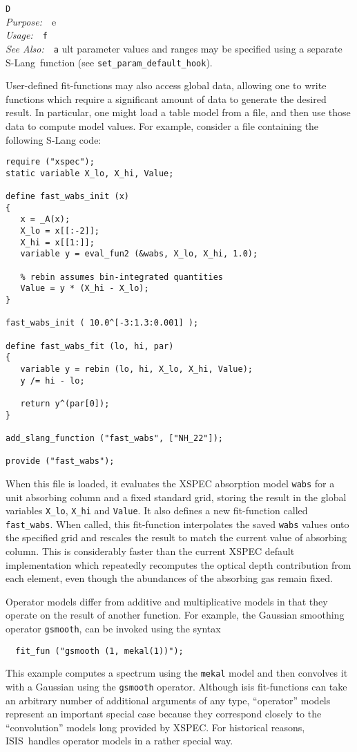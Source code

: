 \documentclass{book}
\makeatletter
\newif\ifpdf
\newcommand{\isis}{{\sc ISIS}}
\newcommand{\slang}{{\sc S-Lang}}
\newenvironment{isisfunction}[4]%
{\index{{#1}@{\tt #1}}%
  \ifpdf
  \else
     \addcontentsline{toc}{subsection}{{#1} -- {#2}}
  \fi
  \vbox{
          \vspace*{\baselineskip}
          {\LARGE\tt #1}\vspace*{\baselineskip}\\
          {{\it Purpose:}~~{#2}}\\
          {{\it Usage:}~~{\tt #3}}\\
          {{\it See Also:}~~{\tt #4}}
       }
}%
{ }
\makeatother
\begin{document}
\begin{isisfunction}
Default parameter values and ranges may be specified using a
separate \slang\ function (see \verb|set_param_default_hook|).

User-defined fit-functions may also access global data, allowing
one to write functions which require a significant amount of data
to generate the desired result.  In particular, one might load a
table model from a file, and then use those data to compute model
values. For example, consider a file containing the following
S-Lang code:

\begin{verbatim}
require ("xspec");
static variable X_lo, X_hi, Value;

define fast_wabs_init (x)
{
   x = _A(x);
   X_lo = x[[:-2]];
   X_hi = x[[1:]];
   variable y = eval_fun2 (&wabs, X_lo, X_hi, 1.0);

   % rebin assumes bin-integrated quantities
   Value = y * (X_hi - X_lo);
}

fast_wabs_init ( 10.0^[-3:1.3:0.001] );

define fast_wabs_fit (lo, hi, par)
{
   variable y = rebin (lo, hi, X_lo, X_hi, Value);
   y /= hi - lo;

   return y^(par[0]);
}

add_slang_function ("fast_wabs", ["NH_22"]);

provide ("fast_wabs");
\end{verbatim}

When this file is loaded, it evaluates the XSPEC absorption model
\verb|wabs| for a unit absorbing column and a fixed standard grid,
storing the result in the global variables \verb|X_lo|,
\verb|X_hi| and \verb|Value|.  It also defines a new fit-function
called \verb|fast_wabs|.  When called, this fit-function
interpolates the saved \verb|wabs| values onto the specified grid
and rescales the result to match the current value of absorbing
column. This is considerably faster than the current XSPEC default
implementation which repeatedly recomputes the optical depth
contribution from each element, even though the abundances of the
absorbing gas remain fixed.

Operator models differ from additive and multiplicative models
in that they operate on the result of another function. For
example, the Gaussian smoothing operator \verb|gsmooth|, can be
invoked using the syntax
\begin{verbatim}
  fit_fun ("gsmooth (1, mekal(1))");
\end{verbatim}
This example computes a spectrum using the \verb|mekal| model
and then convolves it with a Gaussian using the \verb|gsmooth|
operator. Although isis fit-functions can take an arbitrary
number of additional arguments of any type, ``operator'' models
represent an important special case because they correspond
closely to the ``convolution'' models long provided by XSPEC.
For historical reasons, \isis\ handles operator models in a
rather special way.


\end{isisfunction}
\end{document}
